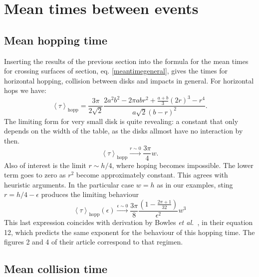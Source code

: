 \documentclass[letterpaper,10pt, jcp, aps]{revtex4-1}
\newcommand{\mean}[1]{\left \langle #1 \right \rangle}
\newcommand{\etal}{\emph{et al.\ }}
\begin{document}
\section{Mean times between events}

\subsection{Mean hopping time}

Inserting the results of the previous section 
into the formula for the mean times for crossing
surfaces of section, eq. \ref{meantimegeneral}, gives the times for 
horizontal hopping, 
collision between disks and impacts in general. For horizontal
hops we have:
\begin{equation}\label{hoptau}
 \mean{\tau}_\text{hopp} = 	
\frac{3 \pi}{2\sqrt{2}}
\frac{2 a^{2} b^{2}  - 2 \pi a b r^{2} + \textstyle \frac{a+b}{3}  (2r)^{3}  -  r^4}
{ a \sqrt{2}  ( b - r )^2}.
\end{equation}
The limiting form for very small disk is quite revealing: a constant
that only depends on the width of the table, as the disks allmost have no interaction
by then.
\begin{equation}\label{hoptaulimit}
 \mean{\tau}_\text{hopp} \xrightarrow{r\sim 0} 	
\frac{3 \pi}{4}w.
\end{equation}
Also of interest is the limit $r\sim h/4$, where hoping becomes
impossible. The lower term goes to zero as $r^2$ become approximately constant.
This agrees with heuristic arguments. 
In the particular case $w=h$ as in our examples,
sting $r=h/4-\epsilon$ produces the limiting behaviour 
\begin{equation}
 \mean{\tau}_\text{hopp}(\epsilon) \xrightarrow{\epsilon\sim 0} 	
\frac{3 \pi}{8}
\frac{(1-\frac{2\pi+1}{32})}
{ \epsilon^2} w^3
\end{equation} 
This last expression coincides with  derivation by Bowles \etal \cite{Bowles04}, in
their equation 12,  which
predicts the same exponent for the behaviour of this hopping time. The figures
2 and 4 of their article correspond to that regimen. 

\subsection{Mean collision time}
\end{document}
